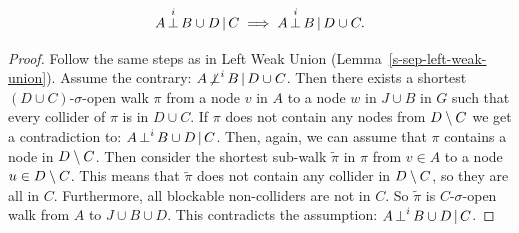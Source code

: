 \begin{Lem} 
    \[A \operatorname*{\perp}^i  B \cup  D \operatorname*{|} C \implies A \operatorname*{\perp}^i  B \operatorname*{|} D \cup  C.\]
\begin{proof}
    Follow the same steps as in Left Weak Union (Lemma~\ref{s-sep-left-weak-union}). 
    Assume the contrary: $A \operatorname*{\not\perp}^i  B \operatorname*{|} D \cup  C$.
    Then there exists a shortest $(D \cup C)$-$\sigma$-open walk $\pi$ 
    from a node $v$ in $A$ to a node $w$ in $J \cup B$ in $G$ such that every collider of $\pi$ is in $D \cup C$.
    If $\pi$ does not contain any nodes from $D \setminus C$ we get a contradiction to: $A \operatorname*{\perp}^i  B \cup  D \operatorname*{|} C$.
    Then, again, we can assume that $\pi$ contains a node in $D \setminus C$. 
    Then consider the shortest sub-walk $\tilde \pi$ in $\pi$ from $v \in A$ to a node $u \in D \setminus C$.
    This means that $\tilde \pi$ does not contain any collider in $D\setminus C$,
    so they are all in $C$. Furthermore, all blockable non-colliders are not in $C$. 
    So $\tilde \pi$ is $C$-$\sigma$-open walk from $A$ to $J \cup B \cup D$. 
    This contradicts the assumption: $A \operatorname*{\perp}^i  B \cup D  \operatorname*{|} C$.
\end{proof}
\end{Lem}

